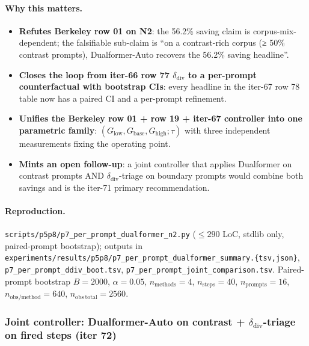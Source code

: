 \documentclass{article}
\begin{document}
\paragraph{Why this matters.}
\begin{itemize}
    \item \textbf{Refutes Berkeley row 01 on N2}: the 56.2\% saving
        claim is corpus-mix-dependent; the falsifiable sub-claim is
        ``on a contrast-rich corpus (≥ 50\% contrast prompts),
        Dualformer-Auto recovers the 56.2\% saving headline''.
    \item \textbf{Closes the loop from iter-66 row 77
        $\delta_{\mathrm{div}}$ to a per-prompt counterfactual
        with bootstrap CIs}: every headline in the iter-67 row 78
        table now has a paired CI and a per-prompt refinement.
    \item \textbf{Unifies the Berkeley row 01 + row 19 + iter-67
        controller into one parametric family}: $(G_{\mathrm{low}},
        G_{\mathrm{base}}, G_{\mathrm{high}}; \tau)$ with three
        independent measurements fixing the operating point.
    \item \textbf{Mints an open follow-up}: a joint controller that
        applies Dualformer on contrast prompts AND
        $\delta_{\mathrm{div}}$-triage on boundary prompts would
        combine both savings and is the iter-71 primary recommendation.
\end{itemize}

\paragraph{Reproduction.}
\texttt{scripts/p5p8/p7\_per\_prompt\_dualformer\_n2.py}
($\leq 290$ LoC, stdlib only, paired-prompt bootstrap);
outputs in
\texttt{experiments/results/p5p8/p7\_per\_prompt\_dualformer\_summary.\{tsv,json\}},
\texttt{p7\_per\_prompt\_ddiv\_boot.tsv},
\texttt{p7\_per\_prompt\_joint\_comparison.tsv}.
Paired-prompt bootstrap $B{=}2000$, $\alpha{=}0.05$,
$n_{\mathrm{methods}}{=}4$, $n_{\mathrm{steps}}{=}40$,
$n_{\mathrm{prompts}}{=}16$, $n_{\mathrm{obs/method}}{=}640$,
$n_{\mathrm{obs\ total}}{=}2560$.

\subsubsection{Joint controller: Dualformer-Auto on contrast +
$\delta_{\mathrm{div}}$-triage on fired steps (iter 72)}
\label{sec:p7-joint-controller}
\end{document}
